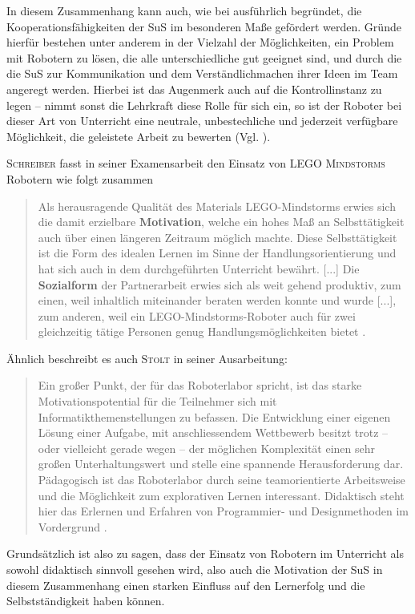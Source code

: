 \documentclass[paper=a4, pagesize, DIV=calc, BCOR=15mm, twoside=on, onecolumn=on, open = right, titlepage =on, parskip =half-, headsepline = on, footsepline = on, chapterprefix = on, appendixprefix = off, fontsize = 12pt, numbers = noenddot, abstract = on]{scrbook}
\numberwithin{equation}{chapter}
\theoremstyle{definition}
\theoremstyle{plain}
\theoremstyle{plain}
\theoremstyle{remark}
\theoremstyle{plain}
\theoremstyle{plain}
\begin{document}
In diesem Zusammenhang kann auch, wie bei \cite{wagner:05} ausführlich begründet, die Kooperationsfähigkeiten der SuS im besonderen Maße gefördert werden. Gründe hierfür bestehen unter anderem in der Vielzahl der Möglichkeiten, ein Problem mit Robotern zu lösen, die alle unterschiedliche gut geeignet sind, und durch die die SuS zur Kommunikation und dem Verständlichmachen ihrer Ideen im Team angeregt werden. Hierbei ist das Augenmerk auch auf die Kontrollinstanz zu legen -- nimmt sonst die Lehrkraft diese Rolle für sich ein, so ist der Roboter bei dieser Art von Unterricht eine neutrale, unbestechliche und jederzeit verfügbare Möglichkeit, die geleistete Arbeit zu bewerten (Vgl. \cite[S.6f.]{wagner:05}).

\textsc{Schreiber} fasst in seiner Examensarbeit den Einsatz von \textsc{LEGO Mindstorms} Robotern wie folgt zusammen
\begin{quote}
Als herausragende Qualität des Materials LEGO-Mindstorms erwies sich die damit erzielbare \textbf{Motivation}, welche ein hohes Maß an Selbsttätigkeit auch über einen längeren Zeitraum möglich machte. Diese Selbsttätigkeit ist die Form des idealen Lernen im Sinne der Handlungsorientierung und hat sich auch in dem durchgeführten Unterricht bewährt. [...] Die \textbf{Sozialform} der Partnerarbeit erwies sich als weit gehend produktiv, zum einen, weil inhaltlich miteinander beraten werden konnte und wurde [...], zum anderen, weil ein LEGO-Mindstorms-Roboter auch für zwei gleichzeitig tätige Personen genug Handlungsmöglichkeiten bietet \cite[S.47f.]{schreiber:04}.
\end{quote}
Ähnlich beschreibt es auch \textsc{Stolt} in seiner Ausarbeitung:
\begin{quote}
Ein großer Punkt, der für das Roboterlabor spricht, ist das starke Motivationspotential für die Teilnehmer sich mit Informatikthemenstellungen zu befassen. Die Entwicklung einer eigenen Lösung einer Aufgabe, mit anschliessendem Wettbewerb besitzt trotz – oder vielleicht gerade wegen – der möglichen Komplexität einen sehr großen Unterhaltungswert und stelle eine spannende Herausforderung dar. Pädagogisch ist das Roboterlabor durch seine teamorientierte Arbeitsweise und die Möglichkeit zum explorativen Lernen interessant. Didaktisch steht hier das Erlernen und Erfahren von Programmier- und Designmethoden im Vordergrund \cite[S.5f.]{stolt:01}.
\end{quote}

Grundsätzlich ist also zu sagen, dass der Einsatz von Robotern im Unterricht als sowohl didaktisch sinnvoll gesehen wird, also auch die Motivation der SuS in diesem Zusammenhang einen starken Einfluss auf den Lernerfolg und die Selbstständigkeit haben können.%
\end{document}
